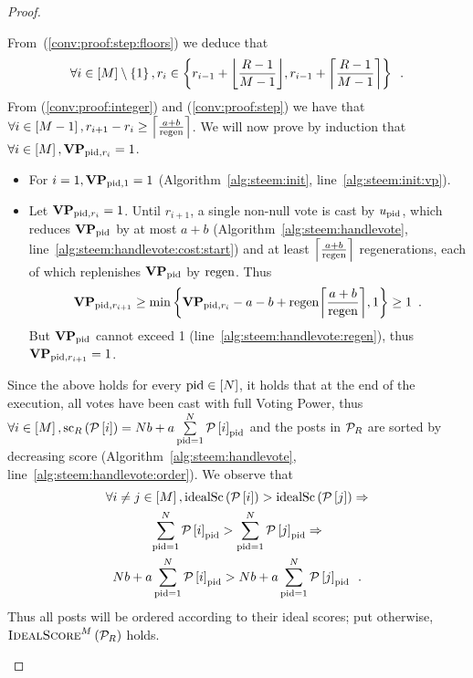 \begin{proof}
\begin{itemize}
    From~(\ref{conv:proof:step:floors}) we deduce that
    \begin{equation}
      \label{conv:proof:step}
      \forall i \in \left[\postlen\right] \setminus \left\{1\right\}, r_i
      \in \left\{r_{i - 1} + \floor*{\frac{\rounds - 1}{\postlen - 1}}, r_{i -
      1} + \ceil*{\frac{\rounds - 1}{\postlen - 1}}\right\} \enspace.
    \end{equation}
    From (\ref{conv:proof:integer}) and (\ref{conv:proof:step}) we have that
    $\forall i \in \left[\postlen - 1\right], r_{i+1} - r_i \geq
    \ceil*{\frac{a+b}{\regen}}$. We will now prove by induction that $\forall i
    \in \left[\postlen\right], \votpowvec_{\pid, r_i} = 1$.

    \begin{itemize}
      \item For $i = 1, \votpowvec_{\pid, 1} = 1$
      (Algorithm~\ref{alg:steem:init}, line~\ref{alg:steem:init:vp}).
      \item Let $\votpowvec_{\pid, r_i} = 1$. Until $r_{i + 1}$, a single
      non-null vote is cast by $u_\pid$, which reduces $\votpowvec_{\pid}$ by at
      most $a + b$ (Algorithm~\ref{alg:steem:handlevote},
      line~\ref{alg:steem:handlevote:cost:start}) and at least $\ceil*{\frac{a +
      b}{\regen}}$ regenerations, each of which replenishes $\votpowvec_{\pid}$
      by $\regen$. Thus
      \begin{equation*}
        \votpowvec_{\pid, r_{i + 1}} \geq \min{\left\{\votpowvec_{\pid, r_i} - a
        - b + \regen\ceil*{\frac{a + b}{\regen}}, 1\right\}} \geq 1 \enspace.
      \end{equation*}
      But $\votpowvec_{\pid}$ cannot exceed 1
      (line~\ref{alg:steem:handlevote:regen}), thus $\votpowvec_{\pid, r_{i +
      1}} = 1$.
    \end{itemize}
    Since the above holds for every $\pid \in \left[\playerlen\right]$, it holds
    that at the end of the execution, all votes have been cast with full Voting
    Power, thus $\forall i \in \left[\postlen\right],
    \mathrm{sc}_{\rounds}\left(\postlist\left[i\right]\right) =
    \playerlen b + a \sum\limits_{\pid = 1}^\playerlen
    \postlist\left[i\right]_{\pid}$ and the posts in $\postlist_R$ are sorted by
    decreasing score (Algorithm~\ref{alg:steem:handlevote},
    line~\ref{alg:steem:handlevote:order}). We observe that
    \begin{gather*}
      \forall i \neq j \in \left[\postlen\right], \idsc{\postlist\left[i\right]}
      > \idsc{\postlist\left[j\right]} \Rightarrow \\
      \sum\limits_{\pid = 1}^\playerlen \postlist\left[i\right]_\pid >
      \sum\limits_{\pid = 1}^\playerlen \postlist\left[j\right]_\pid \Rightarrow
      \\
      \playerlen b + a \sum\limits_{\pid = 1}^\playerlen
      \postlist\left[i\right]_\pid > \playerlen b + a \sum\limits_{\pid =
      1}^\playerlen \postlist\left[j\right]_\pid \enspace.
    \end{gather*}
    Thus all posts will be ordered according to their ideal scores; put
    otherwise, $\textsc{IdealScore}^M\left(\postlist_\rounds\right)$ holds.


\end{itemize}
\end{proof}
